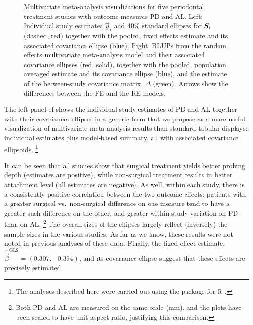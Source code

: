 \begin{figure}[htb]
\begin{minipage}[b]{.49\linewidth}
 \end{minipage}
  \caption{Multivariate meta-analysis visualizations for five periodontal treatment studies with outcome measures PD and AL.
  Left: Individual study estimates $\vec{y}_i$ and 40\% standard ellipses for $\bm{S}_i$ (dashed, red) together with the pooled,
  fixed effects estimate and its associated covariance ellipse (blue).
  Right:  BLUPs from the random effects multivariate meta-analysis model and their associated covariance ellipses
  (red, solid), together with the pooled, population averaged estimate and its covariance ellipse (blue), and the estimate
  of the between-study covariance matrix, $\Delta$ (green). Arrows show the differences between the FE and the RE models.}
  \label{fig:mvmeta2}
\end{figure}

The left panel of  shows the individual study estimates of PD and AL together with their covariances ellipses
in a generic form that we propose as a more useful visualization of multivariate meta-analysis results than standard
tabular displays: individual estimates plus model-based summary, all with associated covariance ellipsoids.%
\footnote{The analyses described here were carried out using the
	  package for R \citep{mvmeta}.
}

It can be seen that all studies show that surgical treatment yields better probing depth (estimates are positive), while
non-surgical treatment results in better attachment level (all estimates are negative).  As well, within each study, there is a consistently
positive correlation between the two outcome effects: patients with a greater surgical vs.\ non-surgical difference on one
measure tend to have a greater such difference on the other, and greater within-study variation on PD than on AL.%
\footnote{Both PD and AL are measured on the same scale (mm), and the plots have been scaled to have unit aspect ratio,
justifying this comparison.}
The overall sizes of the ellipses largely reflect (inversely) the sample sizes in the various studies.
As far as we know, these results were not noted in previous analyses of these data.
Finally, the fixed-effect estimate, $\widehat{\vec{\beta}}^{\textrm{GLS}} = (0.307, -0.394)$,
and its covariance ellipse suggest that these effects are precisely estimated.

